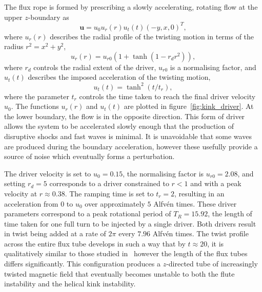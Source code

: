 \documentclass[fleqn,usenatbib]{mnras}
\renewcommand{\vec}[1]{{\bm #1}}
\begin{document}
The flux rope is formed by prescribing a slowly accelerating, rotating flow at
the upper $z$-boundary as
\begin{equation}
  \label{eq:null_twisting_profile}
  \vec{u} = u_0 u_r(r) u_t(t) (-y, x, 0)^T,
\end{equation}
where $u_r(r)$ describes the radial profile of the twisting motion in terms of
the radius $r^2 = x^2 + y^2$,
\begin{equation}
  \label{eq:radial_twisting_function}
  u_r(r) = u_{r0}(1 + \tanh(1 - r_d r^2)),
\end{equation}
where $r_d$ controls the radial extent of the driver, $u_{r0}$ is a normalising
factor, and $u_t(t)$ describes the imposed acceleration of the twisting motion,
\begin{equation}
  \label{eq:ramping_up_function}
  u_t(t) = \tanh^2(t/t_r),
\end{equation}
where the parameter $t_r$ controls the time taken to reach the final driver
velocity $u_0$. The functions $u_r(r)$ and $u_t(t)$ are plotted in
figure~\ref{fig:kink_driver}. At the lower boundary, the flow is in the
opposite direction. This form of driver allows the system to be accelerated
slowly enough that the production of disruptive shocks and fast waves is
minimal. It is unavoidable that some waves are produced during the boundary
acceleration, however these usefully provide a source of noise which eventually
forms a perturbation.

The driver velocity is set to $u_0 = 0.15$, the normalising factor is $u_{r0}
= 2.08$, and setting $r_d = 5$ corresponds to a driver constrained to $r<1$ and
with a peak velocity at $r\approx 0.38$. The ramping time is set to $t_r = 2$,
resulting in an acceleration from $0$ to $u_0$ over approximately $5$ Alfv\'en
times. These driver parameters correspond to a peak rotational period of $T_R
= 15.92$, the length of time taken for one full turn to be injected by a single
driver. Both drivers result in twist being added at a rate of $2\pi$ every
$7.96$ Alfv\'en times. The twist profile across the entire flux tube develops
in such a way that by $t\approx 20$, it is qualitatively similar to those
studied
in~\citet{quinnEffectAnisotropicViscosity2020,hoodCoronalHeatingMagnetic2009,barefordShockHeatingNumerical2015}
however the length of the flux tubes differs significantly. This configuration
produces a $z$-directed tube of increasingly twisted magnetic field that
eventually becomes unstable to both the flute instability and the helical kink
instability.
\end{document}
